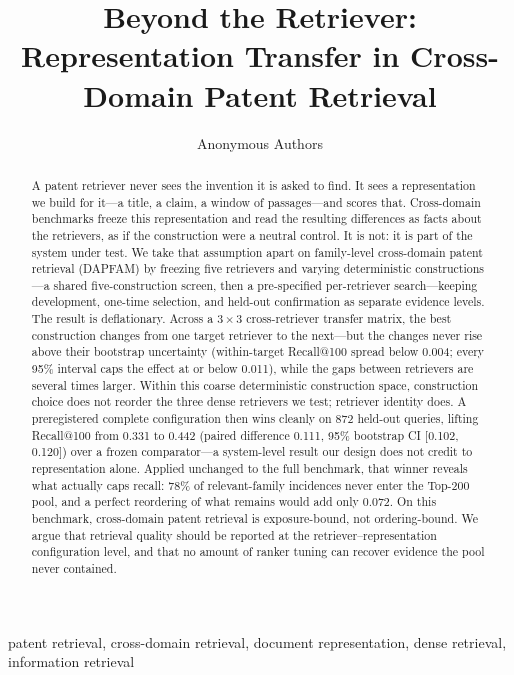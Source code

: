 \documentclass[a4paper,conference]{IEEEtran}
\title{Beyond the Retriever: Representation Transfer in Cross-Domain Patent Retrieval}
\author{Anonymous Authors}
\begin{document}
\maketitle

\begin{abstract}
A patent retriever never sees the invention it is asked to find. It sees a representation we build for it---a title, a claim, a window of passages---and scores that. Cross-domain benchmarks freeze this representation and read the resulting differences as facts about the retrievers, as if the construction were a neutral control. It is not: it is part of the system under test. We take that assumption apart on family-level cross-domain patent retrieval (DAPFAM) by freezing five retrievers and varying deterministic constructions---a shared five-construction screen, then a pre-specified per-retriever search---keeping development, one-time selection, and held-out confirmation as separate evidence levels. The result is deflationary. Across a $3\times3$ cross-retriever transfer matrix, the best construction changes from one target retriever to the next---but the changes never rise above their bootstrap uncertainty (within-target Recall@100 spread below 0.004; every 95\% interval caps the effect at or below 0.011), while the gaps between retrievers are several times larger. Within this coarse deterministic construction space, construction choice does not reorder the three dense retrievers we test; retriever identity does. A preregistered complete configuration then wins cleanly on 872 held-out queries, lifting Recall@100 from 0.331 to 0.442 (paired difference 0.111, 95\% bootstrap CI [0.102, 0.120]) over a frozen comparator---a system-level result our design does not credit to representation alone. Applied unchanged to the full benchmark, that winner reveals what actually caps recall: 78\% of relevant-family incidences never enter the Top-200 pool, and a perfect reordering of what remains would add only 0.072. On this benchmark, cross-domain patent retrieval is exposure-bound, not ordering-bound. We argue that retrieval quality should be reported at the retriever--representation configuration level, and that no amount of ranker tuning can recover evidence the pool never contained.
\end{abstract}

\begin{IEEEkeywords}
patent retrieval, cross-domain retrieval, document representation, dense retrieval, information retrieval
\end{IEEEkeywords}
\end{document}

